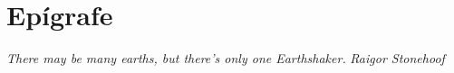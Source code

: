\chapter*{Epígrafe}

\null\vskip15cm%
\begin{flushright}
    \textit{There may be many earths, but there's only one Earthshaker.}
    \hspace{10cm}\textit{Raigor Stonehoof}  
\end{flushright}
\vfill\newpage

\cleardoublepage